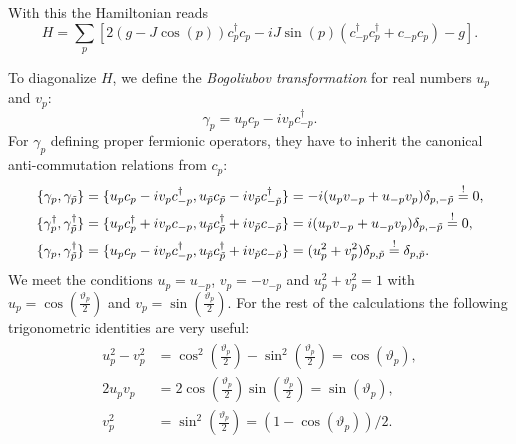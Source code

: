 With this the Hamiltonian reads
\begin{equation}\label{eq:ising_hamiltonian_1d_momentum}
	H = 	\sum_p \left[ 2(g - J\cos(p))c_p^{\dagger}c_p - iJ\sin(p)(c_{-p}^{\dagger}c_p^{\dagger} + c_{-p}c_p) - g\right].
\end{equation}

\noindent To diagonalize $H$, we define the \textit{Bogoliubov transformation} for real numbers $u_p$ and $v_p$:
\begin{equation}\label{eq:bogoliubov}
	\gamma_p = u_p c_p - i v_p c_{-p}^{\dagger}.
\end{equation}
For $\gamma_p$ defining proper fermionic operators, they have to inherit the canonical anti-commutation relations from $c_p$:
\begin{align}
\begin{split}
	\{ \gamma_p, \gamma_{\Tilde{p}} \} &= \{ u_p c_p - i v_p c_{-p}^{\dagger}, u_{\Tilde{p}} c_{\Tilde{p}} - i v_{\Tilde{p}} c_{-{\Tilde{p}}}^{\dagger} \} = -i(u_p v_{-p} + u_{-p} v_p)\delta_{p,-\Tilde{p}} \overset{!}{=} 0, \\
	\{\gamma_p^{\dagger}, \gamma_{\Tilde{p}}^{\dagger}\} &= \{u_p c_p^{\dagger} + i v_p c_{-p}, u_{\Tilde{p}} c_{\Tilde{p}}^{\dagger} + i v_{\Tilde{p}} c_{-{\Tilde{p}}}\} = i(u_p v_{-p} + u_{-p} v_p)\delta_{p,-\Tilde{p}} \overset{!}{=} 0, \\
	\{ \gamma_p, \gamma_{\Tilde{p}}^{\dagger} \} &= \{ u_p c_p - i v_p c_{-p}^{\dagger}, u_{\Tilde{p}} c_{\Tilde{p}}^{\dagger} + i v_{\Tilde{p}} c_{-{\Tilde{p}}} \} = (u_p^2 + v_p^2)\delta_{p,\Tilde{p}} \overset{!}{=} \delta_{p,\Tilde{p}}.
\end{split}
\end{align}
We meet the conditions $u_p = u_{-p}$, $v_p = -v_{-p}$ and $u_p^2 + v_p^2 = 1$ with $u_p = \cos(\frac{\vartheta_p}{2})$ and $v_p = \sin(\frac{\vartheta_p}{2})$. For the rest of the calculations the following trigonometric identities are very useful:
\begin{align} \label{eq:trigonometric_identities}
\begin{split}
	u_p^2  - v_p^2 &= \cos^2 \left( \frac{\vartheta_p}{2} \right) - \sin^2 \left( \frac{\vartheta_p}{2} \right) =  \cos(\vartheta_p), \\
	2 u_p v_p &= 2 \cos(\frac{\vartheta_p}{2}) \sin(\frac{\vartheta_p}{2}) = \sin(\vartheta_p), \\
	v_p^2 &= \sin^2 \left( \frac{\vartheta_p}{2} \right) = (1-\cos(\vartheta_p))/2.
\end{split}
\end{align}
